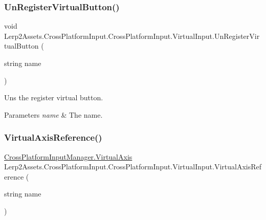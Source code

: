\subsubsection{\texorpdfstring{Un\+Register\+Virtual\+Button()}{UnRegisterVirtualButton()}}
{\footnotesize\ttfamily void Lerp2\+Assets.\+Cross\+Platform\+Input.\+Cross\+Platform\+Input.\+Virtual\+Input.\+Un\+Register\+Virtual\+Button (\begin{DoxyParamCaption}\item[{string}]{name }\end{DoxyParamCaption})\hspace{0.3cm}{\ttfamily [inline]}}



Uns the register virtual button. 


\begin{DoxyParams}{Parameters}
{\em name} & The name.\\
\hline
\end{DoxyParams}
\mbox{\label{class_lerp2_assets_1_1_cross_platform_input_1_1_cross_platform_input_1_1_virtual_input_a22b59803066a699b19cc22948f47518f}} 
\subsubsection{\texorpdfstring{Virtual\+Axis\+Reference()}{VirtualAxisReference()}}
{\footnotesize\ttfamily \hyperlink{class_lerp2_assets_1_1_cross_platform_input_1_1_cross_platform_input_manager_1_1_virtual_axis}{Cross\+Platform\+Input\+Manager.\+Virtual\+Axis} Lerp2\+Assets.\+Cross\+Platform\+Input.\+Cross\+Platform\+Input.\+Virtual\+Input.\+Virtual\+Axis\+Reference (\begin{DoxyParamCaption}\item[{string}]{name }\end{DoxyParamCaption})\hspace{0.3cm}{\ttfamily [inline]}}



